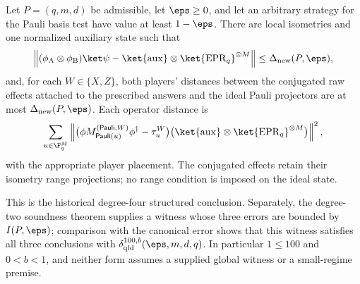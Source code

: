 \begin{theorem}
\label{thm:pauli-final-quantitative-soundness}
\leanok
{}
Let $P=(q,m,d)$ be admissible, let $\eps\geq0$, and let an arbitrary strategy
for the Pauli basis test have value at least $1-\eps$.  There are local
isometries and one normalized auxiliary state such that
\[
 \left\|(\phi_{\mathrm A}\otimes\phi_{\mathrm B})\ket\psi
   -\ket{\mathrm{aux}}\otimes\ket{\mathrm{EPR}_q}^{\otimes M}\right\|
 \leq\Delta_{\mathrm{new}}(P,\eps),
\]
and, for each $W\in\{X,Z\}$, both players' distances between the conjugated
raw effects attached to the prescribed answers and the ideal Pauli projectors
are at most $\Delta_{\mathrm{new}}(P,\eps)$.  Each operator distance is
\[
 \sum_{u\in\F_q^M}
 \left\|\bigl(\phi M^{(\mathsf{Pauli},W)}_{\mathsf{Pauli}(u)}
       \phi^\dagger-\tau_u^W\bigr)
       \bigl(\ket{\mathrm{aux}}\otimes
         \ket{\mathrm{EPR}_q}^{\otimes M}\bigr)\right\|^2,
\]
with the appropriate player placement.  The conjugated effects retain their
isometry range projections; no range condition is imposed on the ideal state.

This is the historical degree-four structured conclusion.  Separately, the
degree-two soundness theorem supplies a witness whose three errors are bounded
by $I(P,\eps)$; comparison with the canonical error shows that this witness
satisfies all three conclusions with
$\delta_{\mathrm{qld}}^{100,b}(\eps,m,d,q)$.  In particular $1\leq100$ and
$0<b<1$, and neither form assumes a supplied global witness or a small-regime
premise.
\end{theorem}
